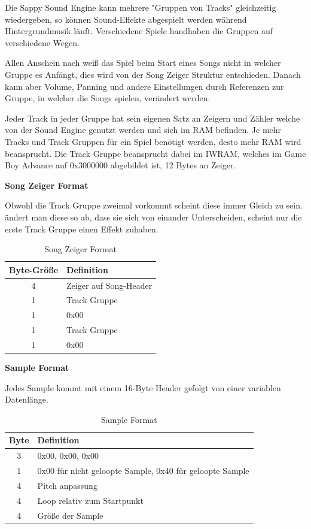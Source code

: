 \documentclass[11pt,a4paper]{scrartcl}
\newcommand{\paratitle}[1] {
    \vspace{5mm}
    \large \textbf{#1} \normalsize
    \vspace{2mm}\newline
}
\begin{document}
Die Sappy Sound Engine kann mehrere "Gruppen von Tracks" gleichzeitig wiedergeben, so k\"onnen Sound-Effekte abgespielt werden w\"ahrend Hintergrundmusik l\"auft. Verschiedene Spiele handhaben die Gruppen auf verschiedene Wegen.

Allen Anschein nach wei{\ss} das Spiel beim Start eines Songs nicht in welcher Gruppe es Anf\"angt, dies wird von der Song Zeiger Struktur entschieden. Danach kann aber Volume, Panning und andere Einstellungen durch Referenzen zur Gruppe, in welcher die Songs spielen, ver\"andert werden.

Jeder Track in jeder Gruppe hat sein eigenen Satz an Zeigern und Z\"ahler welche von der Sound Engine genutzt werden und sich im RAM befinden. Je mehr Tracks und Track Gruppen f\"ur ein Spiel ben\"otigt werden, desto mehr RAM wird beansprucht.\newline
Die Track Gruppe beansprucht dabei im IWRAM, welches im Game Boy Advance auf 0x3000000 abgebildet ist, 12 Bytes an Zeiger. 


\paratitle{Song Zeiger Format}
Obwohl die Track Gruppe zweimal vorkommt scheint diese immer Gleich zu sein. \"andert man diese so ab, dass sie sich von einander Unterscheiden, scheint nur die erste Track Gruppe einen Effekt zuhaben.

\begin{table}[h]
    \centering
    \begin{tabular}{ c | p{8cm} }
        \textbf{Byte-Gr\"o{\ss}e} & \textbf{Definition}\\
        \hline
        4 & Zeiger auf Song-Header\\
				\hline
        1 & Track Gruppe\\
				\hline
        1 & 0x00\\
				\hline
        1 & Track Gruppe\\
				\hline
        1 & 0x00\\
    \end{tabular}
    \caption{Song Zeiger Format}
    \label{table:SongZeiger}
\end{table}


\newpage
\paratitle{Sample Format}
Jedes Sample kommt mit einem 16-Byte Header gefolgt von einer variablen Datenl\"ange.

\begin{table}[h]
    \centering
    \begin{tabular}{ c | p{15cm} }
        \textbf{Byte} & \textbf{Definition}\\
				\hline
        3 & 0x00, 0x00, 0x00\\
				\hline
        1 & 0x00 f\"ur nicht geloopte Sample, 0x40 f\"ur geloopte Sample\\
				\hline
        4 & Pitch anpassung\\
				\hline
        4 & Loop relativ zum Startpunkt\\
				\hline
        4 & Gr\"o{\ss}e der Sample\\
    \end{tabular}
    \caption{Sample Format}
    \label{table:SampleFormat}
\end{table}
\end{document}
